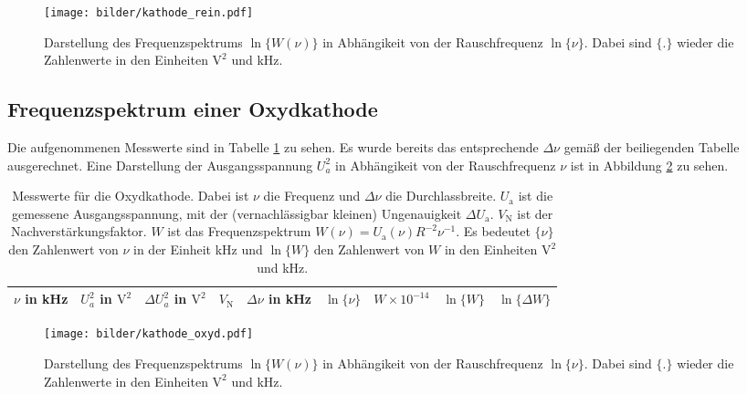 	\begin{figure}
		\centering
		\texttt{[image: bilder/kathode\_rein.pdf]}
		\caption{Darstellung des Frequenzspektrums $\ln\{W(\nu)\}$ in
		Abhängikeit von der Rauschfrequenz $\ln\{\nu\}$. Dabei sind $\{ . \}$ wieder
		die Zahlenwerte in den Einheiten $\text{V}^2$ und kHz.}
		\label{fig:kathode_rein}
	\end{figure}

\clearpage
\subsection{Frequenzspektrum einer Oxydkathode}

	Die aufgenommenen Messwerte sind in Tabelle
	\ref{tab:kathode_oxyd} zu sehen. Es wurde bereits das
	entsprechende $\Delta \nu$ gemäß der beiliegenden Tabelle
	ausgerechnet. Eine Darstellung der Ausgangsspannung $U_a^2$ in
	Abhängikeit von der Rauschfrequenz $\nu$ ist in Abbildung
	\ref{fig:kathode_oxyd} zu sehen.
	\begin{table}
		\centering
		\begin{tabular}{ccccccccc}
		\toprule \midrule
		$\nu$ in kHz	 & $U_a^2$ in $\text{V}^2$	& $\Delta U_a^2$ in $\text{V}^2$ &
		$V_\text{N}$	 & $\Delta \nu$ in kHz 		& $\ln \{\nu\}$				     &
        $W\times 10^{-14}$&$\ln \{W\}$	 & $\ln \{\Delta W\} $ \\
		\midrule
		
		\midrule
		\bottomrule
		\end{tabular}
		\caption{Messwerte für
		die Oxydkathode. Dabei ist $\nu$ die Frequenz und $\Delta \nu$ die
		Durchlassbreite. $U_\text{a}$ ist die gemessene Ausgangsspannung, mit der
		(vernachlässigbar kleinen) Ungenauigkeit $\Delta U_\text{a}$. $V_\text{N}$
		ist der Nachverstärkungsfaktor. $W$ ist das Frequenzspektrum
		$W(\nu)=U_\text{a}(\nu) R^{-2} \nu^{-1}$. Es bedeutet $\{\nu \}$ den
		Zahlenwert von $\nu$ in der Einheit kHz und $\ln\{W\}$ den Zahlenwert
		von $W$ in den Einheiten $\text{V}^2$ und kHz.}
		\label{tab:kathode_oxyd}
	\end{table}

	\begin{figure}
		\centering
		\texttt{[image: bilder/kathode\_oxyd.pdf]}
		\caption{Darstellung des Frequenzspektrums $\ln\{W(\nu)\}$ in
		Abhängikeit von der Rauschfrequenz $\ln\{\nu\}$. Dabei sind $\{ . \}$ wieder
		die Zahlenwerte in den Einheiten $\text{V}^2$ und kHz.}
		\label{fig:kathode_oxyd}
	\end{figure}

